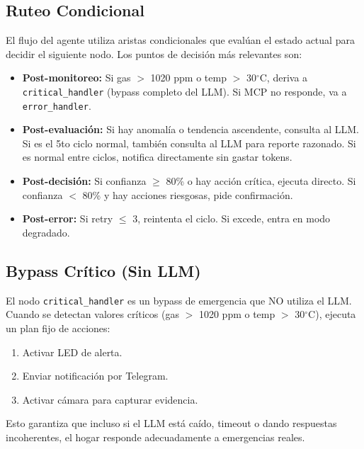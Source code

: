 \documentclass[12pt,letterpaper]{article}
\begin{document}
\subsection{Ruteo Condicional}

El flujo del agente utiliza aristas condicionales que evalúan el estado actual para decidir el siguiente nodo. Los puntos de decisión más relevantes son:

\begin{itemize}
    \item \textbf{Post-monitoreo:} Si gas $>$ 1020 ppm o temp $>$ 30$^{\circ}$C, deriva a \mbox{\texttt{critical\_handler}} (bypass completo del LLM). Si MCP no responde, va a \mbox{\texttt{error\_handler}}.
    \item \textbf{Post-evaluación:} Si hay anomalía o tendencia ascendente, consulta al LLM. Si es el 5to ciclo normal, también consulta al LLM para reporte razonado. Si es normal entre ciclos, notifica directamente sin gastar tokens.
    \item \textbf{Post-decisión:} Si confianza $\ge$ 80\% o hay acción crítica, ejecuta directo. Si confianza $<$ 80\% y hay acciones riesgosas, pide confirmación.
    \item \textbf{Post-error:} Si retry $\le$ 3, reintenta el ciclo. Si excede, entra en modo degradado.
\end{itemize}

\subsection{Bypass Crítico (Sin LLM)}

El nodo \mbox{\texttt{critical\_handler}} es un bypass de emergencia que NO utiliza el LLM. Cuando se detectan valores críticos (gas $>$ 1020 ppm o temp $>$ 30$^{\circ}$C), ejecuta un plan fijo de acciones:

\begin{enumerate}
    \item Activar LED de alerta.
    \item Enviar notificación por Telegram.
    \item Activar cámara para capturar evidencia.
\end{enumerate}

Esto garantiza que incluso si el LLM está caído, timeout o dando respuestas incoherentes, el hogar responde adecuadamente a emergencias reales.

\newpage

\end{document}
